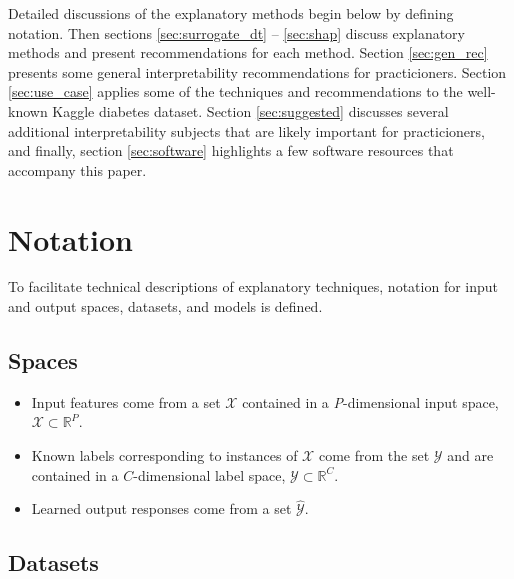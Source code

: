 \documentclass{article}
\begin{document}
Detailed discussions of the explanatory methods begin below by defining notation. Then sections \ref{sec:surrogate_dt} -- \ref{sec:shap} discuss explanatory methods and present recommendations for each method. Section \ref{sec:gen_rec} presents some general interpretability recommendations for practicioners. Section \ref{sec:use_case} applies some of the techniques and recommendations to the well-known Kaggle diabetes dataset. Section \ref{sec:suggested} discusses several additional interpretability subjects that are likely important for practicioners, and finally, section \ref{sec:software} highlights a few software resources that accompany this paper. 

\section{Notation} \label{sec:notation}

To facilitate technical descriptions of explanatory techniques, notation for input and output spaces, datasets, and models is defined.

\subsection{Spaces} 
 
	\begin{itemize}
		\item Input features come from a set $\mathcal{X}$ contained in a \textit{P}-dimensional input space, $\mathcal{X} \subset \mathbb{R}^P$.  
		\item Known labels corresponding to instances of $\mathcal{X}$ come from the set $\mathcal{Y}$ and are contained in a $C$-dimensional label space, $\mathcal{Y} \subset \mathbb{R}^C$.
		\item Learned output responses come from a set $\mathcal{\hat{Y}}$. %
	\end{itemize}	
	
\subsection{Datasets} 
\end{document}
